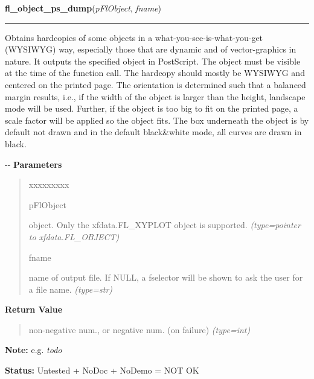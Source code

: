 \hspace{.8\funcindent}\begin{boxedminipage}{\funcwidth}

    \raggedright \textbf{fl\_object\_ps\_dump}(\textit{pFlObject}, \textit{fname})

    \vspace{-1.5ex}

    \rule{\textwidth}{0.5\fboxrule}
\setlength{\parskip}{2ex}

Obtains hardcopies of some objects in a what-you-see-is-what-you-get
(WYSIWYG) way, especially those that are dynamic and of vector-graphics
in nature. It outputs the specified object in PostScript. The object must
be visible at the time of the function call. The hardcopy should mostly
be WYSIWYG and centered on the printed page. The orientation is determined
such that a balanced margin results, i.e., if the width of the object is
larger than the height, landscape mode will be used. Further, if the
object is too big to fit on the printed page, a scale factor will be
applied so the object fits. The box underneath the object is by default
not drawn and in the default black\&white mode, all curves are drawn in
black.

-{}-
\setlength{\parskip}{1ex}
      \textbf{Parameters}
      \vspace{-1ex}

      \begin{quote}
        \begin{Ventry}{xxxxxxxxx}

          \item[pFlObject]


object. Only the xfdata.FL\_XYPLOT object is supported.
            {\it (type=pointer to xfdata.FL\_OBJECT)}

          \item[fname]


name of output file. If NULL, a fselector will be shown to ask the
user for a file name.
            {\it (type=str)}

        \end{Ventry}

      \end{quote}

      \textbf{Return Value}
    \vspace{-1ex}

      \begin{quote}

non-negative num., or negative num. (on failure)
      {\it (type=int)}

      \end{quote}

\textbf{Note:} 
e.g. \emph{todo}


\textbf{Status:} 
Untested + NoDoc + NoDemo = NOT OK


    \end{boxedminipage}

